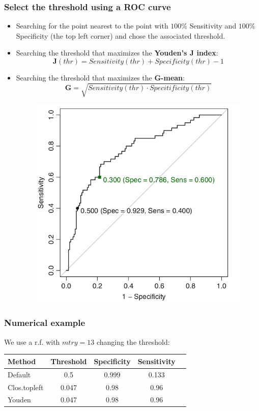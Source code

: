 \documentclass[9pt]{beamer}
\begin{document}
\begin{frame}
\frametitle{Select the threshold using a ROC curve}
\begin{itemize}
\item<1 -> Searching for the point nearest to the point with $100\%$ Sensitivity and $100\%$ Specificity (the top left corner) and chose the associated threshold.
\item<2 -> Searching the threshold that maximizes the \textbf{Youden's J index}:
$$
\textbf{J}(thr) = Sensitivity(thr) + Specificity(thr) - 1
$$
\item<3 ->  Searching the threshold that maximizes the \textbf{G-mean}:
$$
\textbf{G} = \sqrt{Sensitivity(thr)\cdot Specitificity(thr)}
$$
\begin{figure}[ht]
\includegraphics[scale=0.25]{images/ROC curve.png}
\end{figure}
\end{itemize}
\end{frame}

\begin{frame}
\frametitle{Numerical example}
We use a r.f. with $mtry = 13$ changing the threshold:
\begin{table}
\begin{tabular}{l | c | c | c | c }
Method & Threshold & Specificity & Sensitivity\\
\hline \hline
Default & 0.5  & 0.999 & 0.133 \\
Clos.topleft & 0.047 & 0.98 & 0.96 \\
Youden & 0.047 & 0.98 & 0.96 & \\

\end{tabular}
\end{table}
\end{frame}
\end{document}
